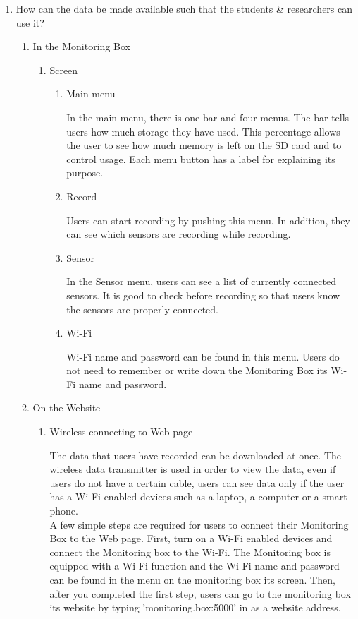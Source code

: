 \documentclass[conference]{IEEEtran}
\begin{document}
\begin{enumerate}
			\item How can the data be made available such that the students \& researchers can use it?
				\begin{enumerate}
					\item In the Monitoring Box
				\begin{enumerate}
			\item Screen
				\begin{enumerate}
					\item Main menu

						In the main menu, there is one bar and four menus. The bar tells users how much storage they have used. This percentage allows the user to see how much memory is left on the SD card and to control usage. Each menu button has a label for explaining its purpose.\\
					\item Record

						Users can start recording by pushing this menu. In addition, they can see which sensors are recording while recording.\\
					\item Sensor

						In the Sensor menu, users can see a list of currently connected sensors. It is good to check before recording so that users know the sensors are properly connected.\\
					\item Wi-Fi

						Wi-Fi name and password can be found in this menu. Users do not need to remember or write down the Monitoring Box its Wi-Fi name and password.\\
				\end{enumerate}
			\end{enumerate}
		\item On the Website
			\begin{enumerate}
				\item Wireless connecting to Web page

					The data that users have recorded can be downloaded at once. The wireless data transmitter is used in order to view the data, even if users do not have a certain cable, users can see data only if the user has a Wi-Fi enabled devices such as a laptop, a computer or a smart phone. \\
					A few simple steps are required for users to connect their Monitoring Box to the Web page. First, turn on a Wi-Fi enabled devices and connect the Monitoring box to the Wi-Fi. The Monitoring box is equipped with a Wi-Fi function and the Wi-Fi name and password can be found in the menu on the monitoring box its screen. Then, after you completed the first step, users can go to the monitoring box its website by typing 'monitoring.box:5000' in as a website address.\\


\end{enumerate}
\end{enumerate}
\end{enumerate}
\end{document}
